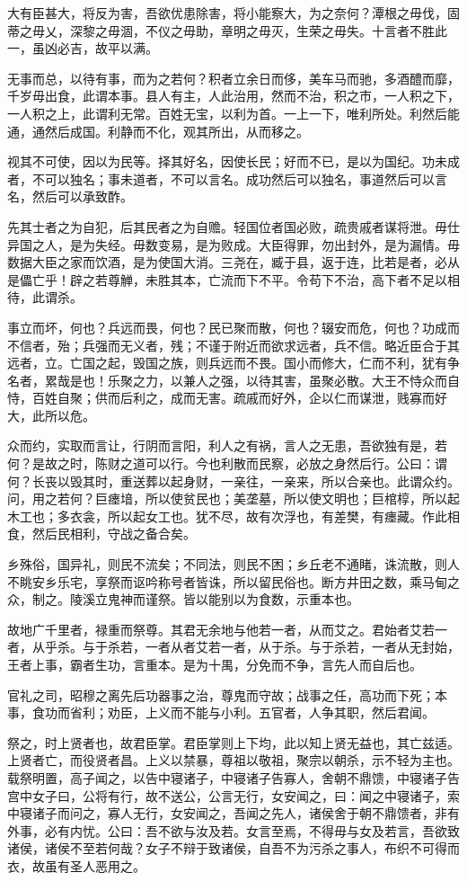 \documentclass[]{article}
\begin{document}
大有臣甚大，将反为害，吾欲优患除害，将小能察大，为之奈何？潭根之毋伐，固蒂之毋乂，深黎之毋涸，不仪之毋助，章明之毋灭，生荣之毋失。十言者不胜此一，虽凶必吉，故平以满。

无事而总，以待有事，而为之若何？积者立余日而侈，美车马而驰，多酒醴而靡，千岁毋出食，此谓本事。县人有主，人此治用，然而不治，积之市，一人积之下，一人积之上，此谓利无常。百姓无宝，以利为首。一上一下，唯利所处。利然后能通，通然后成国。利静而不化，观其所出，从而移之。

视其不可使，因以为民等。择其好名，因使长民；好而不已，是以为国纪。功未成者，不可以独名；事未道者，不可以言名。成功然后可以独名，事道然后可以言名，然后可以承致酢。

先其士者之为自犯，后其民者之为自赡。轻国位者国必败，疏贵戚者谋将泄。毋仕异国之人，是为失经。毋数变易，是为败成。大臣得罪，勿出封外，是为漏情。毋数据大臣之家而饮酒，是为使国大消。三尧在，臧于县，返于连，比若是者，必从是儡亡乎！辟之若尊觯，未胜其本，亡流而下不平。令苟下不治，高下者不足以相待，此谓杀。

事立而坏，何也？兵远而畏，何也？民已聚而散，何也？辍安而危，何也？功成而不信者，殆；兵强而无义者，残；不谨于附近而欲求远者，兵不信。略近臣合于其远者，立。亡国之起，毁国之族，则兵远而不畏。国小而修大，仁而不利，犹有争名者，累哉是也！乐聚之力，以兼人之强，以待其害，虽聚必散。大王不恃众而自恃，百姓自聚；供而后利之，成而无害。疏戚而好外，企以仁而谋泄，贱寡而好大，此所以危。

众而约，实取而言让，行阴而言阳，利人之有祸，言人之无患，吾欲独有是，若何？是故之时，陈财之道可以行。今也利散而民察，必放之身然后行。公曰：谓何？长丧以毁其时，重送葬以起身财，一亲往，一亲来，所以合亲也。此谓众约。问，用之若何？巨瘗堷，所以使贫民也；美垄墓，所以使文明也；巨棺椁，所以起木工也；多衣衾，所以起女工也。犹不尽，故有次浮也，有差樊，有瘗藏。作此相食，然后民相利，守战之备合矣。

乡殊俗，国异礼，则民不流矣；不同法，则民不困；乡丘老不通睹，诛流散，则人不眺安乡乐宅，享祭而讴吟称号者皆诛，所以留民俗也。断方井田之数，乘马甸之众，制之。陵溪立鬼神而谨祭。皆以能别以为食数，示重本也。

故地广千里者，禄重而祭尊。其君无余地与他若一者，从而艾之。君始者艾若一者，从乎杀。与于杀若，一者从者艾若一者，从于杀。与于杀若，一者从无封始，王者上事，霸者生功，言重本。是为十禺，分免而不争，言先人而自后也。

官礼之司，昭穆之离先后功器事之治，尊鬼而守故；战事之任，高功而下死；本事，食功而省利；劝臣，上义而不能与小利。五官者，人争其职，然后君闻。

祭之，时上贤者也，故君臣掌。君臣掌则上下均，此以知上贤无益也，其亡兹适。上贤者亡，而役贤者昌。上义以禁暴，尊祖以敬祖，聚宗以朝杀，示不轻为主也。载祭明置，高子闻之，以告中寝诸子，中寝诸子告寡人，舍朝不鼎馈，中寝诸子告宫中女子曰，公将有行，故不送公，公言无行，女安闻之，曰：闻之中寝诸子，索中寝诸子而问之，寡人无行，女安闻之，吾闻之先人，诸侯舍于朝不鼎馈者，非有外事，必有内忧。公曰：吾不欲与汝及若。女言至焉，不得毋与女及若言，吾欲致诸侯，诸侯不至若何哉？女子不辩于致诸侯，自吾不为污杀之事人，布织不可得而衣，故虽有圣人恶用之。
\end{document}
